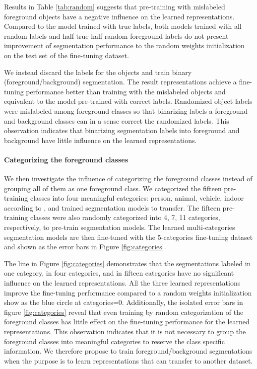 Results in Table \ref{tab:random} suggests that pre-training with mislabeled foreground objects have a negative influence on the learned representations.
Compared to the model trained with true labels, both models trained with all random labels and half-true half-random foreground labels do not present improvement of segmentation performance to the random weights initialization on the test set of the fine-tuning dataset.

We instead discard the labels for the objects and train binary (foreground/background) segmentation.
The result representations achieve a fine-tuning performance better than training with the mislabeled objects and equivalent to the model pre-trained with correct labels.
Randomized object labels were mislabeled among foreground classes so that binarizing labels a foreground and background classes can in a sense correct the randomized labels.
This observation indicates that binarizing segmentation labels into foreground and background have little influence on the learned representations.


\paragraph{Categorizing the foreground classes}
We then investigate the influence of categorizing the foreground classes instead of grouping all of them as one foreground class.
We categorized the fifteen pre-training classes into four meaningful categories: person, animal, vehicle, indoor according to \cite{everingham2015pascal}, and trained segmentation models to transfer.
The fifteen pre-training classes were also randomly categorized into 4, 7, 11 categories, respectively, to pre-train segmentation models.
The learned multi-categories segmentation models are then fine-tuned with the 5-categories fine-tuning dataset and shown as the error bars in Figure \ref{fig:categories}.

The line in Figure \ref{fig:categories} demonstrates that the segmentations labeled in one category, in four categories, and in fifteen categories have no significant influence on the learned representations.
All the three learned representations improve the fine-tuning performance compared to a random weights initialization show as the blue circle at categories=0.
Additionally, the isolated error bars in figure \ref{fig:categories} reveal that even training by random categorization of the foreground classes has little effect on the fine-tuning performance for the learned representations.
This observation indicates that it is not necessary to group the foreground classes into meaningful categories to reserve the class specific information.
We therefore propose to train foreground/background segmentations when the purpose is to learn representations that can transfer to another dataset.

